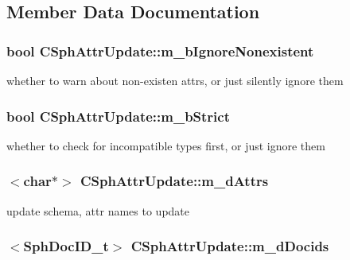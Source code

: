 \subsection{Member Data Documentation}
\hypertarget{structCSphAttrUpdate_a075e1bb316a7fbaa730a00b0e8aed978}{
\subsubsection[{m\-\_\-b\-Ignore\-Nonexistent}]{\setlength{\rightskip}{0pt plus 5cm}bool C\-Sph\-Attr\-Update\-::m\-\_\-b\-Ignore\-Nonexistent}}\label{structCSphAttrUpdate_a075e1bb316a7fbaa730a00b0e8aed978}


whether to warn about non-\/existen attrs, or just silently ignore them 

\hypertarget{structCSphAttrUpdate_a707ad0946e2c43fdc55802545fb5514d}{
\subsubsection[{m\-\_\-b\-Strict}]{\setlength{\rightskip}{0pt plus 5cm}bool C\-Sph\-Attr\-Update\-::m\-\_\-b\-Strict}}\label{structCSphAttrUpdate_a707ad0946e2c43fdc55802545fb5514d}


whether to check for incompatible types first, or just ignore them 

\hypertarget{structCSphAttrUpdate_af6b87e1c9492c7707aca93213cf18f3a}{
\subsubsection[{m\-\_\-d\-Attrs}]{$<$char$\ast$$>$ C\-Sph\-Attr\-Update\-::m\-\_\-d\-Attrs}}\label{structCSphAttrUpdate_af6b87e1c9492c7707aca93213cf18f3a}


update schema, attr names to update 

\hypertarget{structCSphAttrUpdate_af80514672c2da7d0310044485e67375c}{
\subsubsection[{m\-\_\-d\-Docids}]{$<${\bf Sph\-Doc\-I\-D\-\_\-t}$>$ C\-Sph\-Attr\-Update\-::m\-\_\-d\-Docids}}\label{structCSphAttrUpdate_af80514672c2da7d0310044485e67375c}


